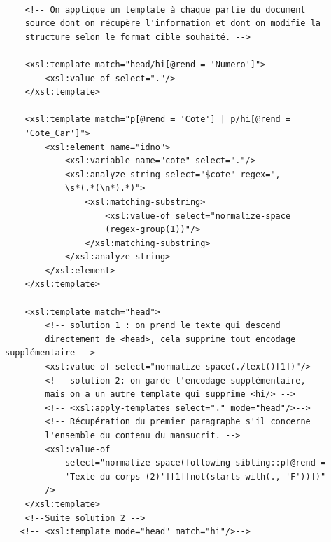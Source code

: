 \documentclass[a4paper,12pt,twoside]{book}
\begin{document}
\begin{verbatim}
   
    <!-- On applique un template à chaque partie du document
    source dont on récupère l'information et dont on modifie la 
    structure selon le format cible souhaité. -->

    <xsl:template match="head/hi[@rend = 'Numero']">
        <xsl:value-of select="."/>
    </xsl:template>

    <xsl:template match="p[@rend = 'Cote'] | p/hi[@rend = 
    'Cote_Car']">
        <xsl:element name="idno">
            <xsl:variable name="cote" select="."/>
            <xsl:analyze-string select="$cote" regex=",
            \s*(.*(\n*).*)">
                <xsl:matching-substring>
                    <xsl:value-of select="normalize-space
                    (regex-group(1))"/>
                </xsl:matching-substring>
            </xsl:analyze-string>
        </xsl:element>
    </xsl:template>

    <xsl:template match="head">
        <!-- solution 1 : on prend le texte qui descend 
        directement de <head>, cela supprime tout encodage supplémentaire -->
        <xsl:value-of select="normalize-space(./text()[1])"/>
        <!-- solution 2: on garde l'encodage supplémentaire, 
        mais on a un autre template qui supprime <hi/> -->
        <!-- <xsl:apply-templates select="." mode="head"/>-->
        <!-- Récupération du premier paragraphe s'il concerne 
        l'ensemble du contenu du mansucrit. -->
        <xsl:value-of
            select="normalize-space(following-sibling::p[@rend = 
            'Texte du corps (2)'][1][not(starts-with(., 'F'))])"
        />
    </xsl:template>
    <!--Suite solution 2 -->
   <!-- <xsl:template mode="head" match="hi"/>-->


\end{verbatim}
\end{document}

